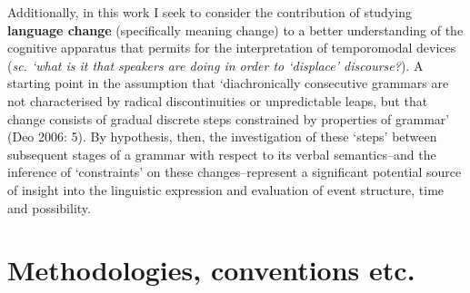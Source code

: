 Additionally, in this work I seek to consider the contribution of studying \textbf{language change} (specifically meaning change) to a better understanding of the cognitive apparatus that permits for the interpretation of temporomodal devices (\textit{sc. `what is it that speakers are doing in order to `displace' discourse?}). A starting point in the assumption that `diachronically consecutive grammars are not characterised by radical discontinuities or unpredictable leaps, but that change consists of gradual discrete steps constrained by properties of grammar' (Deo 2006: 5). By hypothesis, then, the investigation of these `steps' between subsequent stages of a grammar with respect to its verbal semantics--and the inference of `constraints' on these changes--represent a significant potential source of insight into the linguistic expression and evaluation of event structure, time and possibility.

\section{Methodologies, conventions etc.}